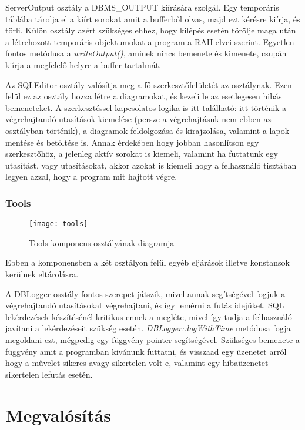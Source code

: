 ServerOutput osztály a DBMS\_OUTPUT kiírására szolgál. Egy temporáris táblába tárolja el a kiírt sorokat amit a bufferből olvas, majd ezt kérésre
kiírja, és törli. Külön osztály azért szükséges ehhez, hogy kilépés esetén törölje maga után a létrehozott temporáris objektumokat a program a
RAII elvei szerint. Egyetlen fontos metódusa a \textit{writeOutput()}, aminek nincs bemenete és kimenete, csupán kiírja a megfelelő helyre a
buffer tartalmát.

Az SQLEditor osztály valósítja meg a fő szerkesztőfelületét az osztálynak. Ezen felül ez az osztály hozza létre a diagramokat, és kezeli le az
esetlegesen hibás bemeneteket. A szerkesztéssel kapcsolatos logika is itt található: itt történik a végrehajtandó utasítások kiemelése (persze a
végrehajtásuk nem ebben az osztályban történik), a diagramok feldolgozása és kirajzolása, valamint a lapok mentése és betöltése is. Annak érdekében
hogy jobban hasonlítson egy szerkesztőhöz, a jelenleg aktív sorokat is kiemeli, valamint ha futtatunk egy utasítást, vagy utasításokat, akkor azokat
is kiemeli hogy a felhasználó tisztában legyen azzal, hogy a program mit hajtott végre.

\subsubsection{Tools}

\begin{figure}
  \begin{center}
  \texttt{[image: tools]}
  \end{center}
 \caption{Tools komponens osztályának diagramja}
\end{figure}

Ebben a komponensben a két osztályon felül egyéb eljárások illetve konstansok kerülnek eltárolásra.

A DBLogger osztály fontos szerepet játszik, mivel annak segítségével fogjuk a végrehajtandó utasításokat végrehajtani, és így lemérni a futás
idejüket. SQL lekérdezések készítésénél kritikus ennek a megléte, mivel így tudja a felhasználó javítani a lekérdezéseit szükség esetén.
\textit{DBLogger::logWithTime} metódusa fogja megoldani ezt, mégpedig egy függvény pointer segítségével. Szükséges bemenete a függvény amit
a programban kivánunk futtatni, és visszaad egy üzenetet arról hogy a művelet sikeres avagy sikertelen volt-e, valamint egy hibaüzenetet
sikertelen lefutás esetén.
\newpage
\section{Megvalósítás}

